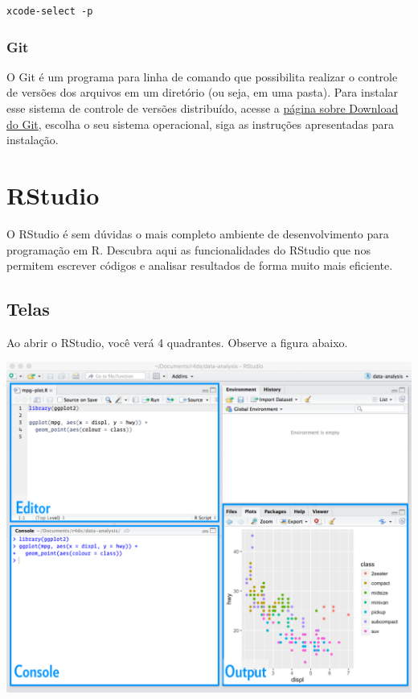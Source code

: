 \documentclass[
]{book}
\begin{document}
\begin{verbatim}
xcode-select -p
\end{verbatim}

\hypertarget{git}{%
\subsection{Git}\label{git}}

O Git é um programa para linha de comando que possibilita realizar o controle de versões dos arquivos em um diretório (ou seja, em uma pasta). Para instalar esse sistema de controle de versões distribuído, acesse a \href{http://git-scm.com/download/}{página sobre Download do Git}, escolha o seu sistema operacional, siga as instruções apresentadas para instalação.

\hypertarget{rstudio}{%
\chapter{RStudio}\label{rstudio}}

O RStudio é sem dúvidas o mais completo ambiente de desenvolvimento para programação em R. Descubra aqui as funcionalidades do RStudio que nos permitem escrever códigos e analisar resultados de forma muito mais eficiente.

\hypertarget{telas}{%
\section{Telas}\label{telas}}

Ao abrir o RStudio, você verá 4 quadrantes. Observe a figura abaixo.

\begin{center}\includegraphics[width=56.24in]{assets/img/rstudio/rstudio-editor} \end{center}
\end{document}
